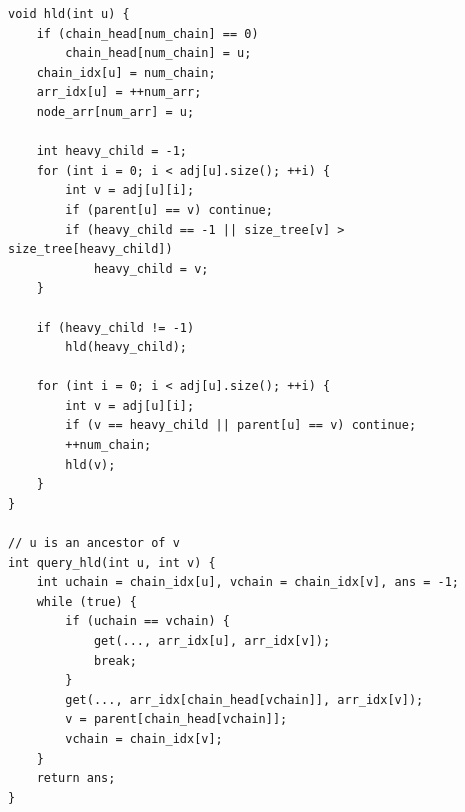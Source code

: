 \documentclass[10pt,landscape]{article}
\begin{document}
\begin{multicols}{2}
\begin{lstlisting}
void hld(int u) {
    if (chain_head[num_chain] == 0)
        chain_head[num_chain] = u;
    chain_idx[u] = num_chain;
    arr_idx[u] = ++num_arr;
    node_arr[num_arr] = u;
    
    int heavy_child = -1;
    for (int i = 0; i < adj[u].size(); ++i) {
        int v = adj[u][i];
        if (parent[u] == v) continue;
        if (heavy_child == -1 || size_tree[v] > size_tree[heavy_child])
            heavy_child = v;
    }

    if (heavy_child != -1)
        hld(heavy_child);

    for (int i = 0; i < adj[u].size(); ++i) {
        int v = adj[u][i];
        if (v == heavy_child || parent[u] == v) continue;
        ++num_chain;
        hld(v);
    }
}

// u is an ancestor of v
int query_hld(int u, int v) {
    int uchain = chain_idx[u], vchain = chain_idx[v], ans = -1;
    while (true) {
        if (uchain == vchain) {
            get(..., arr_idx[u], arr_idx[v]);
            break;
        }
        get(..., arr_idx[chain_head[vchain]], arr_idx[v]);
        v = parent[chain_head[vchain]];
        vchain = chain_idx[v];
    }
    return ans;
}
\end{lstlisting}

\end{multicols}
\end{document}
